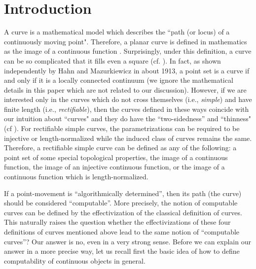 \documentclass{LMCS}
\theoremstyle{plain}
\begin{document}
\section{Introduction}\label{sec-intro}

A curve is a mathematical model which describes the ``path (or locus) of a continuously moving point". Therefore, a planar curve is defined in mathematics as the image of a continuous function . Surprisingly, under this definition, a curve can be so complicated that it fills even a square (cf. \cite{Peano1890,EHMoo1900}). In fact, as shown independently by Hahn and Mazurkiewicz in about 1913, a point set is a curve if and only if it is a locally connected continuum (we ignore the mathematical details in this paper which are not related to our discussion). However, if we are interested only in the curves which do not cross themselves (i.e., {\em simple}) and have finite length (i.e., {\em rectifiable}), then the curves defined in these ways coincide with our intuition about ``curves" and they do have the ``two-sidedness'' and ``thinness" (cf \cite{Why42}). For rectifiable simple curves, the parametrizations can be required to be injective or length-normalized while the induced class of curves remains the same. Therefore, a rectifiable simple curve can be defined as any of the following: a point set of some special topological properties, the image of a continuous function, the image of an injective continuous function, or the image of a continuous function which is length-normalized.

If a point-movement is ``algorithmically determined'', then its path (the curve) should be considered ``computable''. More precisely, the notion of computable curves can be defined by the effectivization of the classical definition of curves. This naturally raises the question whether the effectivizations of these four definitions of curves mentioned above lead to the same notion of ``computable curves''? Our answer is no, even in a very strong sense. Before we can explain our answer in a more precise way, let us recall first the basic idea of how to define computability of continuous objects in general.
\end{document}
